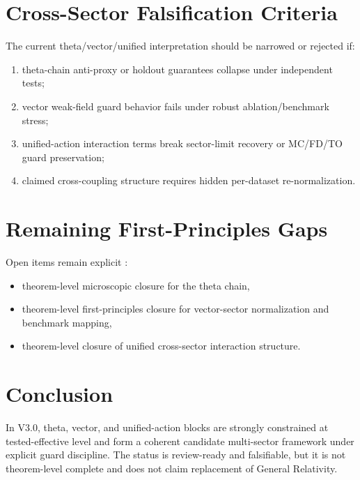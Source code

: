 \documentclass[11pt,a4paper]{article}
\begin{document}
\section{Cross-Sector Falsification Criteria}

The current theta/vector/unified interpretation should be narrowed or rejected if:
\begin{enumerate}
  \item theta-chain anti-proxy or holdout guarantees collapse under independent tests;
  \item vector weak-field guard behavior fails under robust ablation/benchmark stress;
  \item unified-action interaction terms break sector-limit recovery or MC/FD/TO guard preservation;
  \item claimed cross-coupling structure requires hidden per-dataset re-normalization.
\end{enumerate}

\section{Remaining First-Principles Gaps}

Open items remain explicit \cite{theta_theorem_path,unified_action_roadmap,vector_extension}:
\begin{itemize}
  \item theorem-level microscopic closure for the theta chain,
  \item theorem-level first-principles closure for vector-sector normalization and benchmark mapping,
  \item theorem-level closure of unified cross-sector interaction structure.
\end{itemize}

\section{Conclusion}

In V3.0, theta, vector, and unified-action blocks are strongly constrained at tested-effective level and form a coherent candidate multi-sector framework under explicit guard discipline. The status is review-ready and falsifiable, but it is not theorem-level complete and does not claim replacement of General Relativity.



\end{document}
